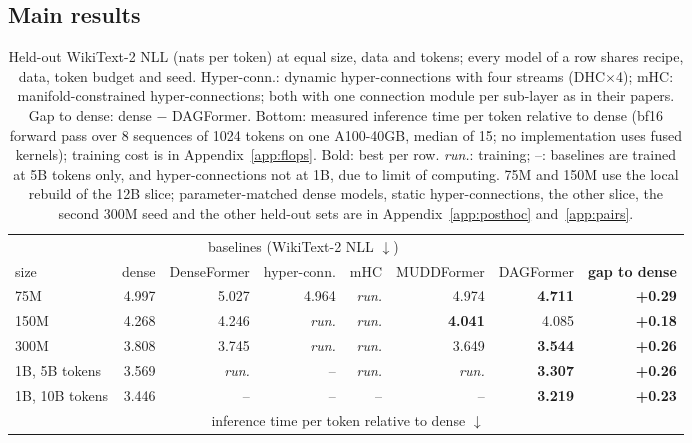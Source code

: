 \documentclass[11pt]{article}
\newcommand{\dagf}{DAGFormer}
\newcommand{\pend}{\textcolor{black!45}{\textit{run.}}}
\begin{document}
\subsection{Main results}
\label{sec:main}

\begin{table}[t]
\centering\footnotesize
\setlength{\tabcolsep}{3.6pt}
\begin{tabular}{l rrrrr r r}
\toprule
& \multicolumn{5}{c}{baselines (WikiText-2 NLL $\downarrow$)} & & \\
\cmidrule(lr){2-6}
size & dense & DenseFormer & hyper-conn. & mHC & MUDDFormer & \dagf{} & \textbf{gap to dense} \\
\midrule
75M & 4.997 & 5.027 & 4.964 & \pend{} & 4.974 & \textbf{4.711} & \textbf{+0.29} \\
150M & 4.268 & 4.246 & \pend{} & \pend{} & \textbf{4.041} & 4.085 & \textbf{+0.18} \\
300M & 3.808 & 3.745 & \pend{} & \pend{} & 3.649 & \textbf{3.544} & \textbf{+0.26} \\
1B, 5B tokens & 3.569 & \pend{} & -- & \pend{} & \pend{} & \textbf{3.307} & \textbf{+0.26} \\
1B, 10B tokens & 3.446 & -- & -- & -- & -- & \textbf{3.219} & \textbf{+0.23} \\
\midrule
& \multicolumn{6}{c}{inference time per token relative to dense $\downarrow$} & \\
\cmidrule(lr){2-7}

\end{tabular}
\caption{Held-out WikiText-2 NLL (nats per token) at equal size, data and tokens; every model of a row shares recipe, data, token budget and seed. Hyper-conn.: dynamic hyper-connections with four streams (DHC$\times$4); mHC: manifold-constrained hyper-connections; both with one connection module per sub-layer as in their papers. Gap to dense: dense $-$ \dagf{}. Bottom: measured inference time per token relative to dense (bf16 forward pass over 8 sequences of 1024 tokens on one A100-40GB, median of 15; no implementation uses fused kernels); training cost is in Appendix~\ref{app:flops}. Bold: best per row. \pend{}: training; --: baselines are trained at 5B tokens only, and hyper-connections not at 1B, due to limit of computing. 75M and 150M use the local rebuild of the 12B slice; parameter-matched dense models, static hyper-connections, the other slice, the second 300M seed and the other held-out sets are in Appendix~\ref{app:posthoc} and~\ref{app:pairs}.}
\label{tab:main}
\end{table}
\end{document}
